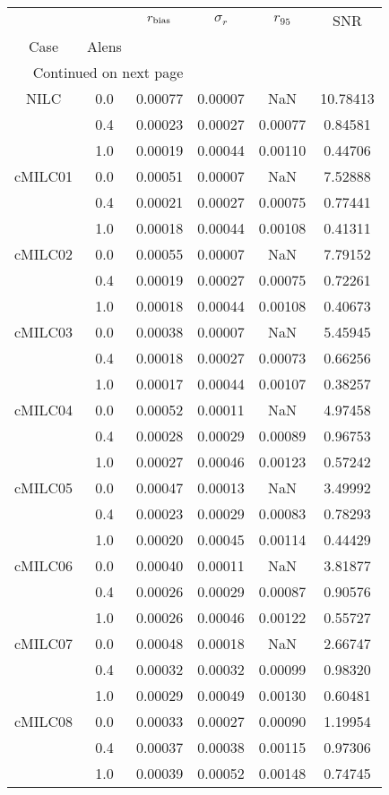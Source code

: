 \begin{longtable}{cccccc}
\toprule
     &     &  $r_{\rm bias}$  &  $\sigma_r$ &  $r_{95}$ &      SNR \\
Case & Alens &                  &             &           &          \\
\midrule
\endhead
\midrule
\multicolumn{3}{r}{{Continued on next page}} \\
\midrule
\endfoot

\bottomrule
\endlastfoot
NILC & 0.0 & 0.00077 & 0.00007 & NaN & 10.78413 \\
     & 0.4 & 0.00023 & 0.00027 & 0.00077 & 0.84581 \\
     & 1.0 & 0.00019 & 0.00044 & 0.00110 & 0.44706 \\
cMILC01 & 0.0 & 0.00051 & 0.00007 & NaN & 7.52888 \\
     & 0.4 & 0.00021 & 0.00027 & 0.00075 & 0.77441 \\
     & 1.0 & 0.00018 & 0.00044 & 0.00108 & 0.41311 \\
cMILC02 & 0.0 & 0.00055 & 0.00007 & NaN & 7.79152 \\
     & 0.4 & 0.00019 & 0.00027 & 0.00075 & 0.72261 \\
     & 1.0 & 0.00018 & 0.00044 & 0.00108 & 0.40673 \\
cMILC03 & 0.0 & 0.00038 & 0.00007 & NaN & 5.45945 \\
     & 0.4 & 0.00018 & 0.00027 & 0.00073 & 0.66256 \\
     & 1.0 & 0.00017 & 0.00044 & 0.00107 & 0.38257 \\
cMILC04 & 0.0 & 0.00052 & 0.00011 & NaN & 4.97458 \\
     & 0.4 & 0.00028 & 0.00029 & 0.00089 & 0.96753 \\
     & 1.0 & 0.00027 & 0.00046 & 0.00123 & 0.57242 \\
cMILC05 & 0.0 & 0.00047 & 0.00013 & NaN & 3.49992 \\
     & 0.4 & 0.00023 & 0.00029 & 0.00083 & 0.78293 \\
     & 1.0 & 0.00020 & 0.00045 & 0.00114 & 0.44429 \\
cMILC06 & 0.0 & 0.00040 & 0.00011 & NaN & 3.81877 \\
     & 0.4 & 0.00026 & 0.00029 & 0.00087 & 0.90576 \\
     & 1.0 & 0.00026 & 0.00046 & 0.00122 & 0.55727 \\
cMILC07 & 0.0 & 0.00048 & 0.00018 & NaN & 2.66747 \\
     & 0.4 & 0.00032 & 0.00032 & 0.00099 & 0.98320 \\
     & 1.0 & 0.00029 & 0.00049 & 0.00130 & 0.60481 \\
cMILC08 & 0.0 & 0.00033 & 0.00027 & 0.00090 & 1.19954 \\
     & 0.4 & 0.00037 & 0.00038 & 0.00115 & 0.97306 \\
     & 1.0 & 0.00039 & 0.00052 & 0.00148 & 0.74745 \\
\end{longtable}
